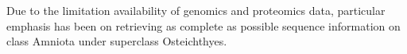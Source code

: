 Due to the limitation availability of genomics and proteomics data, particular emphasis has been on retrieving as complete as possible sequence information on class Amniota under superclass Osteichthyes.  
